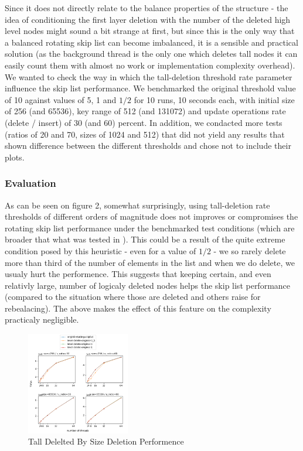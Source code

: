 \documentclass{article}
\begin{document}
Since it does not directly relate to the balance properties of the structure - the idea of conditioning the first layer deletion with the number of the deleted high level nodes might sound a bit strange at first, but since this is the only way that a balanced rotating skip list can become imbalanced, it is a sensible and practical solution (as the background thread is the only one which deletes tall nodes it can easily count them with almost no work or implementation complexity overhead). We wanted to check the way in which the tall-deletion threshold rate parameter influence the skip list performance. We benchmarked the original threshold value of 10 against values of 5, 1 and $1/2$ for 10 runs, 10 seconds each, with initial size of 256 (and 65536), key range of 512 (and 131072) and update operations rate (delete / insert) of 30 (and 60) percent. In addition, we condacted more tests (ratios of 20 and 70, sizes of 1024 and 512) that did not yield any results that shown difference between the different thresholds and chose not to include their plots.

\subsubsection{Evaluation}
\label{sssec:tds-evl}

As can be seen on figure 2, somewhat surprisingly, using tall-deletion rate thresholds of different orders of magnitude does not improves or compromises the rotating skip list performance under the benchmarked test conditions (which are broader that what was tested in \cite{C1}). This could be a result of the quite extreme condition posed by this heuristic - even for a value of $1/2$ - we so rarely delete more than third of the number of elements in the list and when we do delete, we usualy hurt the performence. This suggests that keeping certain, and even relativly large, number of logicaly deleted nodes helps the skip list performance (compared to the situation where those are deleted and others raise for rebealacing). The above makes the effect of this feature on the complexity practicaly negligible. 

\begin{figure}
	\caption{Tall Delelted By Size Deletion Performence}
	\centering
	\includegraphics[width=0.4\textwidth]{level-delete-original_plot}
\end{figure}
\end{document}
